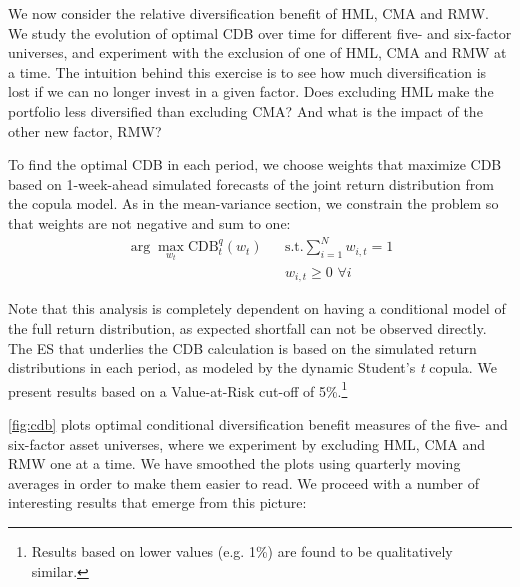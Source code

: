 We now consider the relative diversification benefit of HML, CMA and RMW. We study the evolution of optimal CDB over time for different five- and six-factor universes, and experiment with the exclusion of one of HML, CMA and RMW at a time. The intuition behind this exercise is to see how much diversification is lost if we can no longer invest in a given factor. Does excluding HML make the portfolio less diversified than excluding CMA? And what is the impact of the other new factor, RMW?

To find the optimal CDB in each period, we choose weights that maximize CDB based on 1-week-ahead simulated forecasts of the joint return distribution from the copula model. As in the mean-variance section, we constrain the problem so that weights are not negative and sum to one:
\begin{align*}
  \arg\!\max_{w_t} \text{CDB}_t^q(w_t)
    && \text{s.t.} \sum_{i=1}^N w_{i,t} = 1 \\
    && w_{i,t} \ge 0 \,\, \forall i
\end{align*}

Note that this analysis is completely dependent on having a conditional model of the full return distribution, as expected shortfall can not be observed directly. The ES that underlies the CDB calculation is based on the simulated return distributions in each period, as modeled by the dynamic Student's \textit{t} copula. We present results based on a Value-at-Risk cut-off of 5\%.\footnote{Results based on lower values (e.g. 1\%) are found to be qualitatively similar.} 

\autoref{fig:cdb} plots optimal conditional diversification benefit measures of the five- and six-factor asset universes, where we experiment by excluding HML, CMA and RMW one at a time. We have smoothed the plots using quarterly moving averages in order to make them easier to read. We proceed with a number of interesting results that emerge from this picture:

